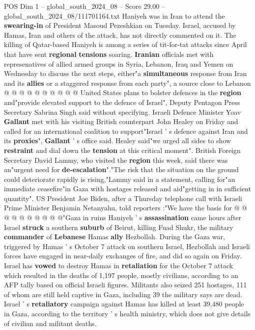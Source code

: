 \begin{textsample}{POS Dim 1 – global\_south\_2024\_08 – Score 29.00 – global\_south\_2024\_08/111701164.txt}
Haniyeh was in Iran to attend the \textbf{swearing-in} of President Masoud Pezeshkian on Tuesday.
Israel, accused by Hamas, Iran and others of the attack, has not directly commented on it.
The killing of Qatar-based Haniyeh is among a series of tit-for-tat attacks since April that have sent \textbf{regional} \textbf{tensions} soaring. \textbf{Iranian} officials met with represenatives of allied armed groups in Syria, Lebanon, Iraq and Yemen on Wednesday to discuss the next steps, either"a \textbf{simultaneous} response from Iran and its \textbf{allies} or a staggered response from each party", a source close to Lebanon @ @ @ @ @ @ @ @ @ @ United States plans to bolster defences in the \textbf{region} and"provide elevated support to the defence of Israel", Deputy Pentagon Press Secretary Sabrina Singh said without specifying.
Israeli Defence Minister Yoav \textbf{Gallant} met with his visiting British counterpart John Healey on Friday and called for an international coalition to support"Israel ' s defence against Iran and its \textbf{proxies}", \textbf{Gallant} ' s office said.
Healey said"we urged all sides to show \textbf{restraint} and dial down the \textbf{tension} at this critical moment".
British Foreign Secretary David Lammy, who visited the \textbf{region} this week, said there was an"urgent need for \textbf{de-escalation}"."The risk that the situation on the ground could deteriorate rapidly is rising,"Lammy said in a statement, calling for"an immediate ceasefire"in Gaza with hostages released and aid"getting in in sufficient quantity".
US President Joe Biden, after a Thursday telephone call with Israeli Prime Minister Benjamin Netanyahu, told reporters :"We have the basis for @ @ @ @ @ @ @ @ @ @"Gaza in ruins Haniyeh ' s \textbf{assassination} came hours after Israel \textbf{struck} a southern \textbf{suburb} of Beirut, killing Fuad Shukr, the military \textbf{commander} of \textbf{Lebanese} Hamas \textbf{ally} Hezbollah.
During the Gaza war, triggered by Hamas ' s October 7 attack on southern Israel, Hezbollah and Israeli forces have engaged in near-daily exchanges of fire, and did so again on Friday.
Israel has \textbf{vowed} to destroy Hamas in \textbf{retaliation} for the October 7 attack which resulted in the deaths of 1,197 people, mostly civilians, according to an AFP tally based on official Israeli figures.
Militants also seized 251 hostages, 111 of whom are still held captive in Gaza, including 39 the military says are dead.
Israel ' s \textbf{retaliatory} campaign against Hamas has killed at least 39,480 people in Gaza, according to the territory ' s health ministry, which does not give details of civilian and militant deaths.

\end{textsample}
